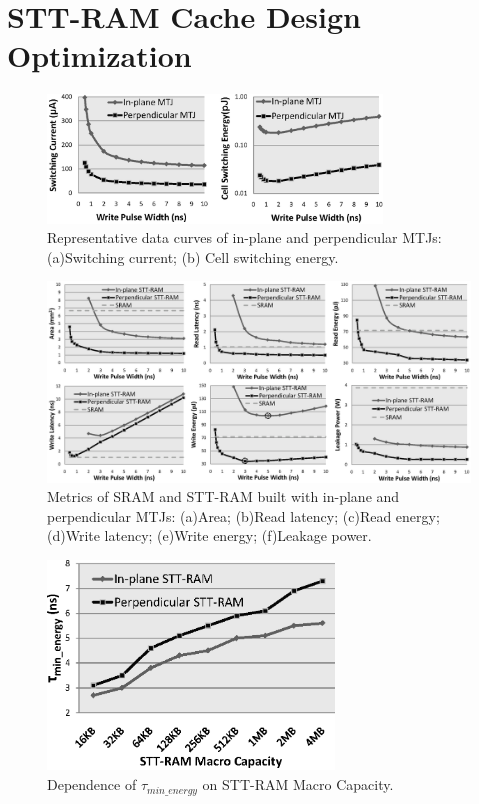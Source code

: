 \section{STT-RAM Cache Design Optimization} \label{sec:opt}

\begin{figure}[t]
  \centering
  \includegraphics[width=3.5in]{fig/MTJSpec.eps}
  \caption{Representative data curves of in-plane and perpendicular MTJs: (a)Switching current; (b) Cell switching energy.}
  \label{fig:specs}
\end{figure}

\begin{figure}[t]
  \centering
  \includegraphics[width=7in]{fig/AllMetrics.eps}
  \caption{Metrics of SRAM and STT-RAM built with in-plane and perpendicular MTJs: (a)Area; (b)Read latency; (c)Read energy; (d)Write latency; (e)Write energy; (f)Leakage power.}
  \label{fig:metrics}
\end{figure}

\begin{figure}[t]
  \centering
  \includegraphics[width=3in]{fig/MinEnergy.eps}
  \caption{Dependence of $\tau_{min\_energy}$ on STT-RAM Macro Capacity.}
  \label{fig:minenergy}
\end{figure}